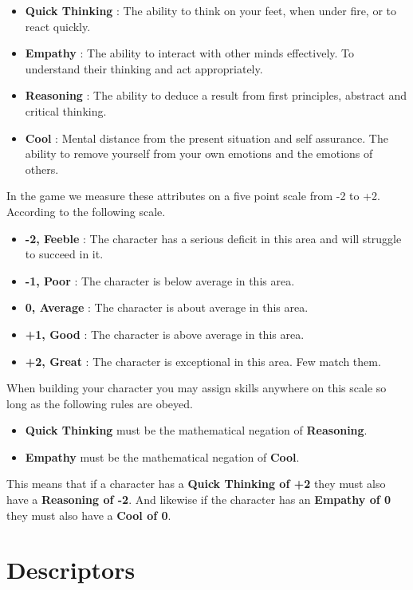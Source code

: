 \documentclass[letterpaper,12pt,landscape,twocolumn]{book}
\begin{document}
\begin{itemize}
\item \textbf{Quick Thinking} : The ability to think on your feet, when under
  fire, or to react quickly.
\item \textbf{Empathy} : The ability to interact with other minds
  effectively. To understand their thinking and act appropriately. 
\item \textbf{Reasoning} : The ability to deduce a result from first
  principles, abstract and critical thinking. 
\item \textbf{Cool} : Mental distance from the present situation and
  self assurance. The ability to remove yourself from your own
  emotions and the emotions of others.
\end{itemize}

In the game we measure these attributes on a five point scale from -2
to +2. According to the following scale.

\begin{itemize}
\item \textbf{-2, Feeble} : The character has a serious deficit in
  this area and will struggle to succeed in it.
\item \textbf{-1, Poor} : The character is below average in this
  area.
\item \textbf{0, Average} : The character is about average in this area.
\item \textbf{+1, Good} : The character is above average in this
  area.
\item \textbf{+2, Great} : The character is exceptional in this
  area. Few match them. 
\end{itemize}

When building your character you may assign skills anywhere on this
scale so long as the following rules are obeyed. 

\begin{itemize}
\item \textbf{Quick Thinking} must be the mathematical negation of \textbf{Reasoning}.
\item \textbf{Empathy} must be the mathematical negation of \textbf{Cool}.
\end{itemize}

This means that if a character has a \textbf{Quick Thinking of +2}
they must also have a \textbf{Reasoning of -2}. And likewise if the
character has an \textbf{Empathy of 0} they must also have a
\textbf{Cool of 0}.

\section{Descriptors}
\end{document}
